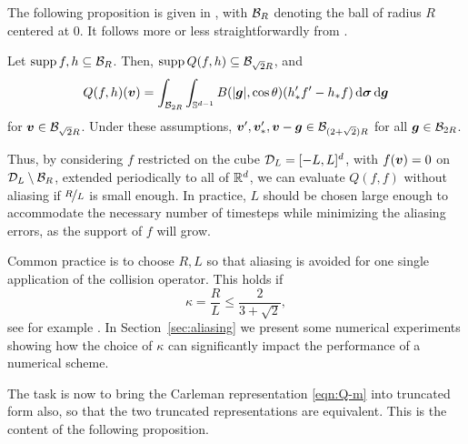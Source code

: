The following proposition is given in \cite{Pareschi2000nsb}, with $\mathcal{B}_R$ denoting
the ball of radius $R$ centered at $0$. It follows more or less straightforwardly from \cite{Pareschi1996fsm}.
\begin{proposition} \label{prop:trunc}
Let $\operatorname{supp} f,h\subseteq\mathcal{B}_R$. Then, $\operatorname{supp} Q(f,h)\subseteq\mathcal{B}_{\sqrt{2}R}$, and 
\[ 
    Q(f,h)({\bm v}) = \int_{\mathcal{B}_{2R}}\int_{\mathbb{S}^{d-1}} 
            B(|{\bm g}|,\cos\theta)(h_*'f'-h_*f)\,\mathrm{d}{\bm\sigma} \,\mathrm{d} {\bm g} 
\]
for ${\bm v}\in\mathcal{B}_{\sqrt{2}R}$. Under these assumptions,
${\bm v}',{\bm v}_*',{\bm v}-{\bm g}\in\mathcal{B}_{(2+\sqrt{2})R}$ for all ${\bm g}\in\mathcal{B}_{2R}$.
\end{proposition}
Thus, by considering $f$ restricted on the cube $\mathcal{D}_L=[-L,L]^d$, with
$f({\bm v})=0$ on $\mathcal{D}_L\setminus\mathcal{B}_R$, extended periodically to all of $\mathbb{R}^d$, we
can evaluate $Q(f,f)$ without aliasing if $\nicefrac{R}{L}$ is small enough. In
practice, $L$ should be chosen large enough to accommodate the necessary number
of timesteps while minimizing the aliasing errors, as the support of $f$ will
grow.

Common practice \cite{Pareschi2000nsb, Mouhot2006fac} is to choose $R,L$ so that aliasing is avoided for one
single application of the collision operator. This holds if
$$
    \kappa = \frac{R}{L} \leq \frac{2}{3+\sqrt{2}},
$$
see for example \cite[Fig. 1]{Pareschi2000nsb}.  In Section~\ref{sec:aliasing} we present some numerical
experiments showing how the choice of $\kappa$ can significantly impact the performance of a numerical scheme.

The task is now to bring the Carleman representation \eqref{eqn:Q-m} into
truncated form also, so that the two truncated representations are equivalent.
This is the content of the following proposition.

